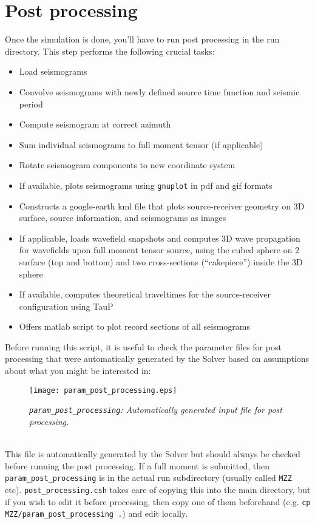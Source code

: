 \documentclass[11pt,letter,fleqn,english,notitlepage]{article}
\begin{document}
\section{Post processing}
Once the simulation is done, you'll have to run post processing in the run directory. This step performs the following 
crucial tasks:
\begin{itemize}
\item Load seismograms
\item Convolve seismograms with newly defined source time function and seismic period
\item Compute seismogram at correct azimuth
\item Sum individual seismograms to full moment tensor (if applicable)
\item Rotate seismogram components to new coordinate system
\item If available, plots seismograms using {\tt gnuplot} in pdf and gif formats
\item Constructs a google-earth kml file that plots source-receiver geometry on 3D surface, source information, 
and seismograms as images
\item If applicable, loads wavefield snapshots and computes 3D wave propagation for wavefields upon full
moment tensor source, using the cubed sphere on 2 surface (top and bottom) and two cross-sections (``cakepiece'') 
inside the 3D sphere
\item If available, computes theoretical traveltimes for the source-receiver configuration using TauP
\item Offers matlab script to plot record sections of all seismograms
\end{itemize}

\noindent Before running this script, it is useful to check the parameter files for post processing that were automatically 
generated by the Solver based on assumptions about what you might be interested in:\\

\begin{figure*}[htb]
\begin{center}
\texttt{[image: param\_post\_processing.eps]}
\caption{\textit{{\tt param\_post\_processing}: Automatically generated input file for post processing.}}
\end{center}
\end{figure*}

\\
This file is automatically generated by the Solver but should always be checked before running the post processing. 
If a full moment is submitted, then {\tt param\_post\_processing} is in the actual run subdirectory (usually called {\tt MZZ} etc). 
{\tt post\_processing.csh} takes care of copying this into the main directory, 
but if you wish to edit it before processing, then copy one of them beforehand 
(e.g. {\tt cp MZZ/param\_post\_processing .}) and edit locally.\\
\end{document}
